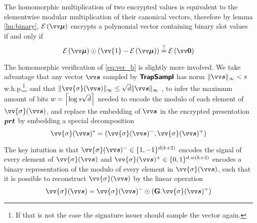 The homomorphic multiplication of two encrypted values is equivalent to the elementwise modular multiplication of their canonical vectors, therefore by lemma \ref{lm:binary}, 
$\enc{\pv{\mu}}$ encrypts a polynomial vector containing binary slot values if and only if 
\begin{equation}\label{eq:hbinmsg}
    \enc{\pv{\mu}}\odot(\vv{1}-\enc{\pv{\mu}})\stackrel{?}{=}\enc{\pv{0}}
\end{equation}

The homomorphic verification of \cref{eq:ver_b} is slightly more involved. 
We take advantage that any vector $\pv{s}$ sampled by $\textsf{\textbf{TrapSampl}}$ has norm $\|\pv{s}\|_{\infty}< s$ w.h.p.\footnote{If that is not the case the signature issuer should sample the vector again.}, and that $\|\vv{\sigma}(\pv{s})\|_{\infty}\leq \sqrt{d}\|\pv{s}\|_{\infty}$ \cite{damgardMultipartyComputationSomewhat2012}, to infer the maximum amount of bits $w=\left\lceil \log s\sqrt{d} \right\rceil$ needed to encode the modulo of each element of $\vv{\sigma}(\pv{s})$, and
replace the embedding of $\pv{s}$ in the encrypted presentation $\bm{prt}$ by embedding a special decomposition 
\[\vv{\sigma}(\pv{s})^* = (\vv{\sigma}(\pv{s})^-,\vv{\sigma}(\pv{s})^+)\]

The key intuition is that $\vv{\sigma}(\pv{s})^- \in \{1,-1\}^{d(k+2)}$ encodes the signal of every element of $\vv{\sigma}(\pv{s})$ and $\vv{\sigma}(\pv{s})^+ \in \{0,1\}^{d.w(k+2)}$ encodes a binary representation of the modulo of every element in $\vv{\sigma}(\pv{s})$, such that it is possible to reconstruct $\vv{\sigma}(\pv{s})$ by the linear operation
\begin{equation}\label{eq:sdecomp}
    \vv{\sigma}(\pv{s}) = \vv{\sigma}(\pv{s})^-\odot(\mG.\vv{\sigma}(\pv{s})^+)
\end{equation}



